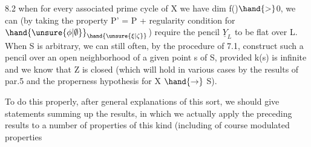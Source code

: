 8.2\hand{,} when  for every associated prime cycle of X we have dim f()$\hand{>}$0,
we can (by taking the property P' = P + regularity condition
for $\hand{\unsure{\phi|\emptyset}}_{\hand{\unsure{\xi|\zeta}}}$) require the pencil $\underline{Y}_L$ to be flat over L. When
S is arbitrary, we can still often, by the procedure of 7.1,
construct such a pencil over an open neighborhood of a given
point s of S, provided k(s) is infinite and we know that Z is closed
(which will hold in various cases by the results of par.5 and
the properness hypothesis for X $\hand{\rightarrow}$ S).

 To do this properly, after general explanations
of this sort, we should give  statements summing up the results,
in which we actually apply the preceding results to a number
of properties of this kind (including of course modulated properties\hand{)}


